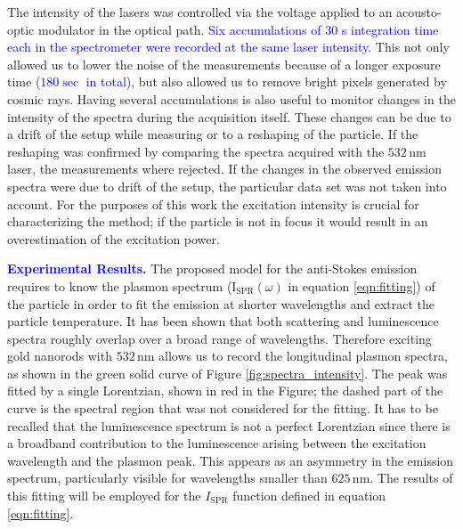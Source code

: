 \documentclass[journal=nalefd,manuscript=letter]{achemso}
\newcommand{\HI}[1]{\textcolor{blue}{#1}} %
\newcommand{\nm}{\ensuremath{\,\textrm{nm}}}
\begin{document}
The intensity of the lasers was controlled via the voltage applied to an
acousto-optic modulator in the optical path. \HI{Six accumulations of $30$ s integration time each
in the spectrometer were recorded at the same laser intensity}. This not only allowed us to
lower the noise of the measurements because of a longer exposure time (\HI{$180\sec$ in total}), but also
allowed us to remove bright pixels generated by cosmic rays. Having several
accumulations is also useful to monitor changes in the intensity of the spectra
during the acquisition itself. These changes can be due to a drift of the setup
while measuring or to a reshaping of the particle. If the reshaping was
confirmed by comparing the spectra acquired with the $532\nm$
laser\cite{Liu2009}, the measurements where rejected. If the changes in the
observed emission spectra were due to drift of the setup, the particular data
set was not taken into account. For the purposes of this work the excitation
intensity is crucial for characterizing the method; if the particle is not in
focus it would result in an overestimation of the excitation power. 



\HI{\textbf{Experimental Results.}} The proposed model for the anti-Stokes emission requires to know the plasmon
spectrum ($\textrm{I}_{\textrm{SPR}}(\omega)$ in equation \ref{eqn:fitting}) of
the particle in order to fit the emission at shorter wavelengths and extract the
particle temperature. It has been shown that both scattering and luminescence
spectra roughly overlap over a broad range of wavelengths\cite{Yorulmaz2012}. Therefore
exciting gold nanorods with $532\nm$ allows us to record the longitudinal
plasmon spectra, as shown in the green solid curve of Figure \ref{fig:spectra_intensity}. The
peak was fitted by a single Lorentzian, shown in red in the Figure; the dashed
part of the curve is the spectral region that was not considered for the
fitting. It has to be recalled that the luminescence spectrum is not a perfect
Lorentzian since there is a broadband contribution to the luminescence arising
between the excitation wavelength and the plasmon peak\cite{Boyd1986}. This
appears as an asymmetry in the emission spectrum, particularly visible for
wavelengths smaller than $625\nm$. The results of this fitting will be employed
for the $I_\textrm{SPR}$ function defined in equation \ref{eqn:fitting}. 
\end{document}
